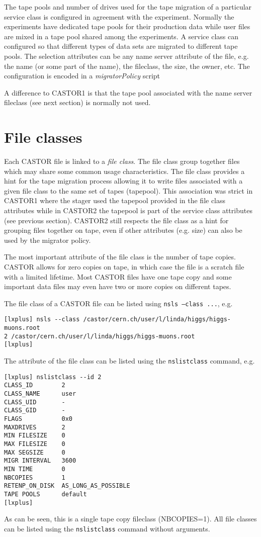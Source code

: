 The tape pools and number of drives used for the tape migration of a particular service class is
configured in agreement with the experiment. Normally the experiments have dedicated tape pools
for their production data while user files are mixed in a tape pool shared among the experiments.
A service class can configured so that different types of data sets are migrated to different
tape pools. The selection attributes can be any name server attribute of the file, e.g. the
name (or some part of the name), the fileclass, the size, the owner, etc. The configuration
is encoded in a {\em migratorPolicy} script

A difference to CASTOR1 is that the tape pool associated with the name server fileclass (see
next section) is normally not used.

\section{File classes}
\label{section:fileclasses}
Each CASTOR file is linked to a {\em file class}. The file class group together files which
may share some common usage characteristics. The file class provides a hint for the tape
migration process allowing it to write files associated with a given file class to the same
set of tapes (tapepool). This association was strict in CASTOR1 where the stager used the
tapepool provided in the file class attributes while in CASTOR2 the tapepool is part of the
service class attributes (see previous section). CASTOR2 still respects the file class
as a hint for grouping files together on tape, even if other attributes (e.g. size) can
also be used by the migrator policy.

The most important attribute of the file class is the number of tape copies. CASTOR allows
for zero copies on tape, in which case the file is a scratch file with a limited lifetime.
Most CASTOR files have one tape copy and some important data files may even have two or more
copies on different tapes.

The file class of a CASTOR file can be listed using {\tt nsls --class ...}, e.g.
\begin{verbatim}
[lxplus] nsls --class /castor/cern.ch/user/l/linda/higgs/higgs-muons.root
2 /castor/cern.ch/user/l/linda/higgs/higgs-muons.root
[lxplus]
\end{verbatim}

The attribute of the file class can be listed using the {\tt nslistclass} command, e.g.
\begin{verbatim}
[lxplus] nslistclass --id 2
CLASS_ID        2
CLASS_NAME      user
CLASS_UID       -
CLASS_GID       -
FLAGS           0x0
MAXDRIVES       2
MIN FILESIZE    0
MAX FILESIZE    0
MAX SEGSIZE     0
MIGR INTERVAL   3600
MIN TIME        0
NBCOPIES        1
RETENP_ON_DISK  AS_LONG_AS_POSSIBLE
TAPE POOLS      default
[lxplus]
\end{verbatim}
As can be seen, this is a single tape copy fileclass (NBCOPIES=1). All file
classes can
be listed using the {\tt nslistclass} command without arguments.

